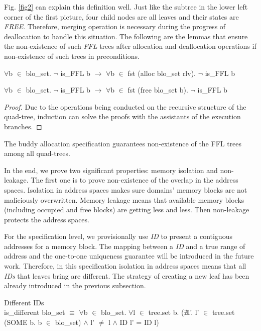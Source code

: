\documentclass[runningheads]{llncs}
\begin{document}
Fig. \ref{fig2} can explain this definition well. Just like the subtree in the lower left corner of the first picture, four child nodes are all leaves and their states are \textsl{FREE}. Therefore, merging operation is necessary during the progress of deallocation to handle this situation. The following are the lemmas that ensure the non-existence of such \textsl{FFL} trees after allocation and deallocation operations if non-existence of such trees in preconditions.

\begin{lemma}
$\forall$b $\in$ blo\_set. $\neg$ is\_FFL b $\longrightarrow$ $\forall$b $\in$ fst (alloc blo\_set rlv). $\neg$ is\_FFL b
\end{lemma}

\begin{lemma}
$\forall$b $\in$ blo\_set. $\neg$ is\_FFL b $\longrightarrow$ $\forall$b $\in$ fst (free blo\_set b). $\neg$ is\_FFL b
\end{lemma}

\begin{proof}
Due to the operations being conducted on the recursive structure of the quad-tree, induction can solve the proofs with the assistants of the execution branches.
\end{proof}

\begin{theorem}
The buddy allocation specification guarantees non-existence of the FFL trees among all quad-trees.
\end{theorem}

In the end, we prove two significant properties: memory isolation and non-leakage. The first one is to prove non-existence of the overlap in the address spaces. Isolation in address spaces makes sure domains' memory blocks are not maliciously overwritten. Memory leakage means that available memory blocks (including occupied and free blocks) are getting less and less. Then non-leakage protects the address spaces.

For the specification level, we provisionally use \textsl{ID} to present a contiguous addresses for a memory block. The mapping between a \textsl{ID} and a true range of address and the one-to-one uniqueness guarantee will be introduced in the future work. Therefore, in this specification isolation in address spaces means that all \textsl{IDs} that leaves bring are different. The strategy of creating a new leaf has been already introduced in the previous subsection.

\begin{definition} {Different IDs} \\
is\_different blo\_set $\equiv$ $\forall$b $\in$ blo\_set. $\forall$l $\in$ tree.set b. ($\nexists$l'. l' $\in$ tree.set (SOME b. b $\in$ blo\_set) $\wedge$ l' $\ne$ l $\wedge$ ID l' = ID l)
\end{definition}
\end{document}
